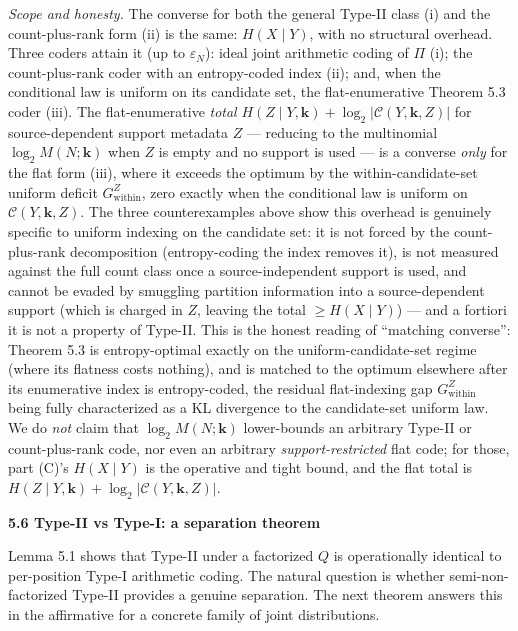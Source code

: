 \documentclass[
]{article}
\begin{document}
\emph{Scope and honesty.} The converse for both the general Type-II
class (i) and the count-plus-rank form (ii) is the same: $H(X \mid Y)$,
with no structural overhead. Three coders attain it (up to
$\varepsilon_N$): ideal joint arithmetic coding of $\Pi$ (i); the
count-plus-rank coder with an entropy-coded index (ii); and, when the
conditional law is uniform on its candidate set, the flat-enumerative
Theorem 5.3 coder (iii). The flat-enumerative \emph{total}
$H(Z \mid Y, \mathbf{k}) + \log_2 |\mathcal{C}(Y,\mathbf{k},Z)|$ for
source-dependent support metadata $Z$ --- reducing to the multinomial
$\log_2 M(N;\mathbf{k})$ when $Z$ is empty and no support is used --- is a
converse \emph{only} for the flat form (iii), where it exceeds the optimum
by the within-candidate-set uniform deficit $G_{\mathrm{within}}^{Z}$,
zero exactly when the conditional law is uniform on
$\mathcal{C}(Y,\mathbf{k},Z)$. The three counterexamples above show this
overhead is genuinely specific to uniform indexing on the candidate set:
it is not forced by the count-plus-rank decomposition (entropy-coding the
index removes it), is not measured against the full count class once a
source-independent support is used, and cannot be evaded by smuggling
partition information into a source-dependent support (which is charged in
$Z$, leaving the total $\geq H(X \mid Y)$) --- and a fortiori it is not a
property of Type-II. This is the honest reading of ``matching converse'':
Theorem 5.3 is entropy-optimal exactly on the uniform-candidate-set
regime (where its flatness costs nothing), and is matched to the optimum
elsewhere after its enumerative index is entropy-coded, the residual
flat-indexing gap $G_{\mathrm{within}}^{Z}$ being fully characterized as a
KL divergence to the candidate-set uniform law. We do \emph{not} claim
that $\log_2 M(N;\mathbf{k})$ lower-bounds an arbitrary Type-II or
count-plus-rank code, nor even an arbitrary \emph{support-restricted}
flat code; for those, part (C)'s $H(X \mid Y)$ is the operative and tight
bound, and the flat total is
$H(Z \mid Y, \mathbf{k}) + \log_2 |\mathcal{C}(Y,\mathbf{k},Z)|$.

\textbf{5.6 Type-II vs Type-I: a separation theorem}

Lemma 5.1 shows that Type-II under a factorized $Q$ is operationally
identical to per-position Type-I arithmetic coding. The natural
question is whether semi-non-factorized Type-II provides a genuine
separation. The next theorem answers this in the affirmative for a
concrete family of joint distributions.
\end{document}
